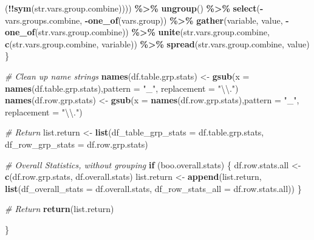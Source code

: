 \documentclass[
]{book}
\newenvironment{Shaded}{\begin{snugshade}}{\end{snugshade}}
\newcommand{\CharTok}[1]{\textcolor[rgb]{0.31,0.60,0.02}{#1}}
\newcommand{\CommentTok}[1]{\textcolor[rgb]{0.56,0.35,0.01}{\textit{#1}}}
\newcommand{\ControlFlowTok}[1]{\textcolor[rgb]{0.13,0.29,0.53}{\textbf{#1}}}
\newcommand{\DataTypeTok}[1]{\textcolor[rgb]{0.13,0.29,0.53}{#1}}
\newcommand{\KeywordTok}[1]{\textcolor[rgb]{0.13,0.29,0.53}{\textbf{#1}}}
\newcommand{\NormalTok}[1]{#1}
\newcommand{\OperatorTok}[1]{\textcolor[rgb]{0.81,0.36,0.00}{\textbf{#1}}}
\newcommand{\StringTok}[1]{\textcolor[rgb]{0.31,0.60,0.02}{#1}}
\begin{document}
\begin{Shaded}
\begin{Highlighting}[]
\NormalTok{                      (}\OperatorTok{!!}\KeywordTok{sym}\NormalTok{(str.vars.group.combine)))) }\OperatorTok{\%\textgreater{}\%}
\StringTok{      }\KeywordTok{ungroup}\NormalTok{() }\OperatorTok{\%\textgreater{}\%}
\StringTok{      }\KeywordTok{select}\NormalTok{(}\OperatorTok{{-}}\NormalTok{vars.groups.combine, }\OperatorTok{{-}}\KeywordTok{one\_of}\NormalTok{(vars.group)) }\OperatorTok{\%\textgreater{}\%}
\StringTok{      }\KeywordTok{gather}\NormalTok{(variable, value, }\OperatorTok{{-}}\KeywordTok{one\_of}\NormalTok{(str.vars.group.combine)) }\OperatorTok{\%\textgreater{}\%}
\StringTok{      }\KeywordTok{unite}\NormalTok{(str.vars.group.combine, }\KeywordTok{c}\NormalTok{(str.vars.group.combine, }\StringTok{\textquotesingle{}variable\textquotesingle{}}\NormalTok{)) }\OperatorTok{\%\textgreater{}\%}
\StringTok{      }\KeywordTok{spread}\NormalTok{(str.vars.group.combine, value)}
\NormalTok{  \}}
  
  \CommentTok{\# Clean up name strings}
  \KeywordTok{names}\NormalTok{(df.table.grp.stats) \textless{}{-}}\StringTok{ }
\StringTok{    }\KeywordTok{gsub}\NormalTok{(}\DataTypeTok{x =} \KeywordTok{names}\NormalTok{(df.table.grp.stats),}\DataTypeTok{pattern =} \StringTok{"\_"}\NormalTok{, }\DataTypeTok{replacement =} \StringTok{"}\CharTok{\textbackslash{}\textbackslash{}}\StringTok{."}\NormalTok{)}
  \KeywordTok{names}\NormalTok{(df.row.grp.stats) \textless{}{-}}\StringTok{ }
\StringTok{    }\KeywordTok{gsub}\NormalTok{(}\DataTypeTok{x =} \KeywordTok{names}\NormalTok{(df.row.grp.stats),}\DataTypeTok{pattern =} \StringTok{"\_"}\NormalTok{, }\DataTypeTok{replacement =} \StringTok{"}\CharTok{\textbackslash{}\textbackslash{}}\StringTok{."}\NormalTok{)}
  
  \CommentTok{\# Return}
\NormalTok{  list.return \textless{}{-}}\StringTok{ }
\StringTok{    }\KeywordTok{list}\NormalTok{(}\DataTypeTok{df\_table\_grp\_stats =}\NormalTok{ df.table.grp.stats, }
         \DataTypeTok{df\_row\_grp\_stats =}\NormalTok{ df.row.grp.stats)}
  
  \CommentTok{\# Overall Statistics, without grouping}
  \ControlFlowTok{if}\NormalTok{ (boo.overall.stats) \{}
\NormalTok{    df.row.stats.all \textless{}{-}}\StringTok{ }\KeywordTok{c}\NormalTok{(df.row.grp.stats, df.overall.stats)}
\NormalTok{    list.return \textless{}{-}}\StringTok{ }\KeywordTok{append}\NormalTok{(list.return, }
                          \KeywordTok{list}\NormalTok{(}\DataTypeTok{df\_overall\_stats =}\NormalTok{ df.overall.stats,}
                               \DataTypeTok{df\_row\_stats\_all =}\NormalTok{ df.row.stats.all))}
\NormalTok{  \}}
  
  \CommentTok{\# Return}
  \KeywordTok{return}\NormalTok{(list.return)}
  
\NormalTok{\}}
\end{Highlighting}
\end{Shaded}
\end{document}
